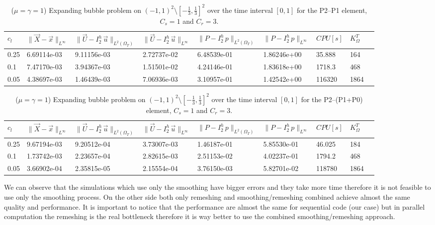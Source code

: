 \documentclass[a4paper,12pt,onecolumn]{article}
\newcommand{\errorXx}{\|\vec{X} - \vec{x}\|_{L^\infty}}
\newcommand{\LerrorUu}[1]{\|\vec U - I^h_{#1}\,\vec u\|_{L^2(\Omega_T)}}
\newcommand{\errorUu}[1]{\|\vec U - I^h_{#1}\,\vec u\|_{L^\infty}}
\newcommand{\errorPp}[1]{\|P - I^h_{#1}\,p\|_{L^\infty}}
\newcommand{\LerrorPp}[1]{\|P - I^h_{#1}\,p\|_{L^2(\Omega_T)}}
\begin{document}
\begin{table}
 \center
 \hspace*{-2cm}
\begin{tabular}{lllllllll}
\hline
$c_l$ & $\errorXx$ & $\LerrorUu2$ & $\errorUu2$ & $\LerrorPp2$ & $\errorPp2$ & $CPU[s]$ & $K_\Omega^T$\\
\hline
0.25 & 6.69114e-03 & 9.11156e-03 & 2.72737e-02 & 6.48539e-01 & 1.86246e+00 & 35.888 & 164\\
0.1 & 7.47170e-03 & 3.94367e-03 & 1.51501e-02 & 4.24146e-01 & 1.83618e+00 & 1718.3 & 468\\
0.05 & 4.38697e-03 & 1.46439e-03 & 7.06936e-03 & 3.10957e-01 & 1.42542e+00 & 116320 & 1864\\%
\hline
\end{tabular}
\hspace*{-2cm}
\caption{($\mu=\gamma=1$) Expanding bubble problem on $(-1,1)^2\setminus[-\frac{1}{3},\frac{1}{3}]^2$ over the time interval $[0,1]$ for the P2--P1 element, $C_s=1$ and $C_r=3$.}
\label{tab:expandingbubble2Dp2p1all}
\end{table}

\begin{table}
 \center
 \hspace*{-2cm}
\begin{tabular}{lllllllll}
\hline
$c_l$ & $\errorXx$ & $\LerrorUu2$ & $\errorUu2$ & $\LerrorPp2$ & $\errorPp2$ & $CPU[s]$ & $K_\Omega^T$\\
\hline
0.25 & 9.67194e-03 & 9.20512e-04 & 3.73007e-03 & 1.46187e-01 & 5.85530e-01 & 46.025 & 184\\
0.1 & 1.73742e-03 & 2.23657e-04 & 2.82615e-03 & 2.51153e-02 & 4.02237e-01 & 1794.2 & 468\\
0.05 & 3.66902e-04 & 2.35815e-05 & 2.15554e-04 & 3.76150e-03 & 5.82701e-02 & 118780 & 1864\\%
\hline
\end{tabular}
\hspace*{-2cm}
\caption{($\mu=\gamma=1$) Expanding bubble problem on $(-1,1)^2\setminus[-\frac{1}{3},\frac{1}{3}]^2$ over the time interval $[0,1]$ for the P2--(P1+P0) element, $C_s=1$ and $C_r=3$.}
\label{tab:expandingbubble2Dp2p1p0all}
\end{table}

We can observe that the simulations which use only the smoothing have bigger errors and they take more time therefore it is not feasible to use only the smoothing process. On the other side both only remeshing and smoothing/remeshing combined achieve almost the same quality and performance. It is important to notice that the performance are almost the same for sequential code (our case) but in parallel computation the remeshing is the real bottleneck therefore it is way better to use the combined smoothing/remeshing approach.  
\newline
\end{document}
